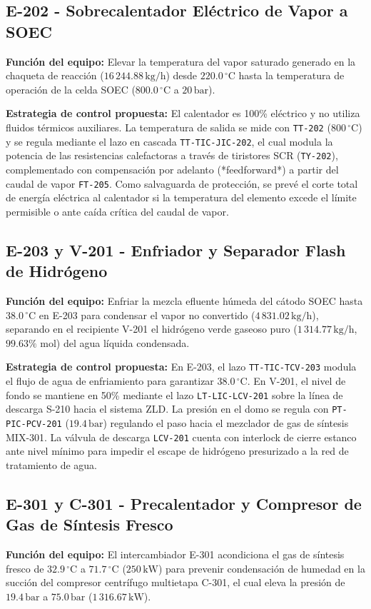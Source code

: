 \documentclass[10pt,letterpaper]{article}
\begin{document}
\subsection{E-202 - Sobrecalentador Eléctrico de Vapor a SOEC}
\textbf{Función del equipo:} Elevar la temperatura del vapor saturado generado en la chaqueta de reacción ($16\,244.88\,\text{kg/h}$) desde $220.0\,^\circ\text{C}$ hasta la temperatura de operación de la celda SOEC ($800.0\,^\circ\text{C}$ a $20\,\text{bar}$).

\textbf{Estrategia de control propuesta:} El calentador es 100\% eléctrico y no utiliza fluidos térmicos auxiliares. La temperatura de salida se mide con \texttt{TT-202} ($800\,^\circ\text{C}$) y se regula mediante el lazo en cascada \texttt{TT-TIC-JIC-202}, el cual modula la potencia de las resistencias calefactoras a través de tiristores SCR (\texttt{TY-202}), complementado con compensación por adelanto (*feedforward*) a partir del caudal de vapor \texttt{FT-205}. Como salvaguarda de protección, se prevé el corte total de energía eléctrica al calentador si la temperatura del elemento excede el límite permisible o ante caída crítica del caudal de vapor.

\subsection{E-203 y V-201 - Enfriador y Separador Flash de Hidrógeno}
\textbf{Función del equipo:} Enfriar la mezcla efluente húmeda del cátodo SOEC hasta $38.0\,^\circ\text{C}$ en E-203 para condensar el vapor no convertido ($4\,831.02\,\text{kg/h}$), separando en el recipiente V-201 el hidrógeno verde gaseoso puro ($1\,314.77\,\text{kg/h}$, $99.63\%\text{ mol}$) del agua líquida condensada.

\textbf{Estrategia de control propuesta:} En E-203, el lazo \texttt{TT-TIC-TCV-203} modula el flujo de agua de enfriamiento para garantizar $38.0\,^\circ\text{C}$. En V-201, el nivel de fondo se mantiene en 50\% mediante el lazo \texttt{LT-LIC-LCV-201} sobre la línea de descarga S-210 hacia el sistema ZLD. La presión en el domo se regula con \texttt{PT-PIC-PCV-201} ($19.4\,\text{bar}$) regulando el paso hacia el mezclador de gas de síntesis MIX-301. La válvula de descarga \texttt{LCV-201} cuenta con interlock de cierre estanco ante nivel mínimo para impedir el escape de hidrógeno presurizado a la red de tratamiento de agua.

\subsection{E-301 y C-301 - Precalentador y Compresor de Gas de Síntesis Fresco}
\textbf{Función del equipo:} El intercambiador E-301 acondiciona el gas de síntesis fresco de $32.9\,^\circ\text{C}$ a $71.7\,^\circ\text{C}$ ($250\,\text{kW}$) para prevenir condensación de humedad en la succión del compresor centrífugo multietapa C-301, el cual eleva la presión de $19.4\,\text{bar}$ a $75.0\,\text{bar}$ ($1\,316.67\,\text{kW}$).
\end{document}
